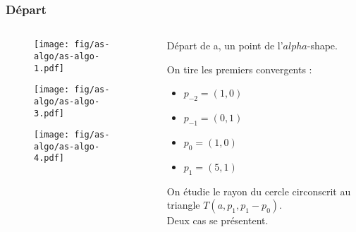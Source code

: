 \begin{frame}
  \frametitle{Départ}
	\begin{columns}[t]
 		\begin{column}{7cm}
      {
        \begin{figure}[h!]
          \centering
          \texttt{[image: fig/as-algo/as-algo-1.pdf]}
      \end{figure}
      }
      {
        \begin{figure}[h!]
          \centering
          \texttt{[image: fig/as-algo/as-algo-3.pdf]}
      \end{figure}
      }
      {
        \begin{figure}[h!]
          \centering
          \texttt{[image: fig/as-algo/as-algo-4.pdf]}
      \end{figure}
      }
    \end{column}
    \begin{column}{3cm}
      \begin{block}{}
        {
					Départ de a, un point de l'$alpha$-shape.          
				}
        {
          On tire les premiers convergents :\\
          \begin{itemize}
            \item $p_{-2} = (1, 0)$
            \item $p_{-1} = (0, 1)$
            \item $p_{0} = (1, 0)$
            \item $p_{1} = (5, 1)$
          \end{itemize}            
        }

        {
          On étudie le rayon du cercle circonscrit au triangle $T(a, p_{1}, p_{1}-p_{0})$.\\
					\alert{Deux cas se présentent.}
        }
      \end{block}     
    \end{column}
  \end{columns}
\end{frame}


